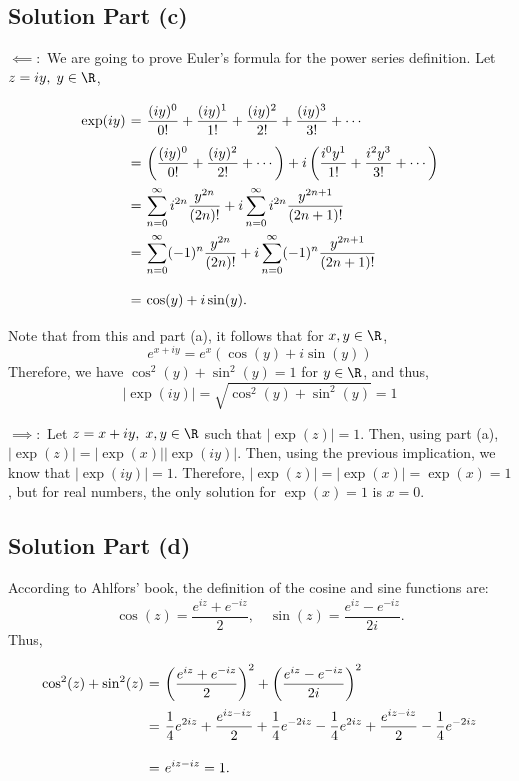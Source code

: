 \subsection*{Solution Part (c)}

$\boldsymbol{\impliedby:}$ We are going to prove Euler's formula for the power series definition. Let $z = iy,\; y\in \R$,
\[ \everymath{\displaystyle}
\arraycolsep=1.8pt\def\arraystretch{2.5}
\begin{array}{rcl}
    \exp(iy) & = & \frac{(iy)^0}{0!} + \frac{(iy)^1}{1!} + \frac{(iy)^2}{2!} + \frac{(iy)^3}{3!} + \cdots\\
    & = & \left( \frac{(iy)^0}{0!} + \frac{(iy)^2}{2!} + \cdots \right) + i\left( \frac{i^0 y^1}{1!} + \frac{i^2 y^3}{3!} + \cdots \right)\\
    & = & \sum_{n = 0}^{\infty} i^{2n}\frac{y^{2n}}{(2n)!} + i \sum_{n = 0}^{\infty} i^{2n}\frac{y^{2n+1}}{(2n+1)!}\\
    & = & \sum_{n = 0}^{\infty} (-1)^{n}\frac{y^{2n}}{(2n)!} + i \sum_{n = 0}^{\infty} (-1)^{n}\frac{y^{2n+1}}{(2n+1)!}\\
    & = & \cos(y) + i \sin(y).
\end{array} \]
Note that from this and part (a), it follows that for $x,y\in\R$,
\[ e^{x+iy} = e^x (\cos(y) + i \sin(y)) \]
Therefore, we have $\cos^2(y) + \sin^2(y) = 1$ for $y\in \R$, and thus,
\[ |\exp(iy)| = \sqrt{\cos^2(y) + \sin^2(y)} = 1 \]

$\boldsymbol{\implies:}$ Let $z = x+iy,\; x,y\in\R$ such that $|\exp(z)| = 1$. Then, using part (a), $|\exp(z)| = |\exp(x)| |\exp(iy)|$. 
Then, using the previous implication, we know that $|\exp(iy)| = 1$. 
Therefore, $|\exp(z)| = |\exp(x)| = \exp(x) = 1$, but for real numbers, the only solution for $\exp(x) = 1$ is $x  = 0$.

\subsection*{Solution Part (d)}
According to Ahlfors' book, the definition of the cosine and sine functions are:
\[ \cos(z) = \frac{e^{iz}+e^{-iz}}{2},\hspace{1em}\sin(z) = \frac{e^{iz}-e^{-iz}}{2i}.  \]
Thus,
\[ \everymath{\displaystyle}
\arraycolsep=1.8pt\def\arraystretch{2.5}
\begin{array}{rcl}
    \cos^2(z) + \sin^2(z) & = & \left( \frac{e^{iz}+e^{-iz}}{2} \right)^2 + \left( \frac{e^{iz}-e^{-iz}}{2i}  \right)^2 \\
    & = & \frac{1}{4} e^{2iz} + \frac{e^{iz-iz}}{2} + \frac{1}{4} e^{-2iz} - \frac{1}{4} e^{2iz} + \frac{e^{iz-iz}}{2} - \frac{1}{4} e^{-2iz}\\
    & = & e^{iz-iz} = 1.
\end{array} \]

